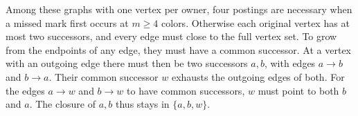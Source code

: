 Among these graphs with one vertex per owner, four postings are
necessary when a missed mark first occurs at $m\ge4$ colors.
Otherwise each original vertex has at most two successors, and every
edge must close to the full vertex set. To grow from the endpoints
of any edge, they must have a common successor. At a vertex with an
outgoing edge there must then be two successors $a,b$, with edges
$a\to b$ and $b\to a$. Their common successor $w$ exhausts the
outgoing edges of both. For the edges $a\to w$ and $b\to w$ to have
common successors, $w$ must point to both $b$ and $a$. The closure of
$a,b$ thus stays in $\{a,b,w\}$.
